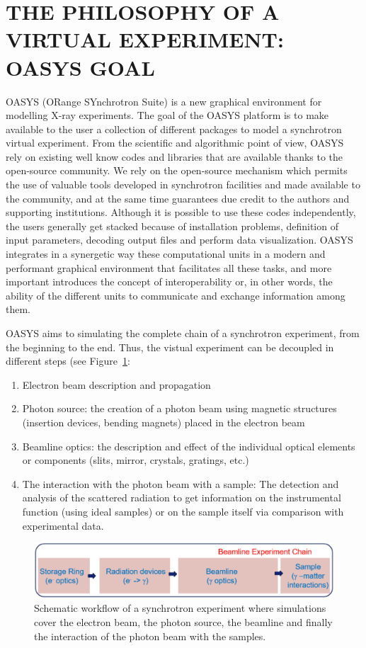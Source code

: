 \documentclass{aip-cp}
\begin{document}
\section{THE PHILOSOPHY OF A VIRTUAL EXPERIMENT: OASYS GOAL}

OASYS (ORange SYnchrotron Suite) is a new graphical environment for modelling X-ray experiments. The goal of the OASYS platform is to make available to the user a collection of different packages to model a synchrotron virtual experiment. From the scientific and algorithmic point of view, OASYS rely on existing well know codes and libraries that are available  thanks to the open-source community. We rely on the open-source mechanism which permits the use of valuable tools developed in synchrotron facilities and made available to the community, and at the same time guarantees due credit to the authors and supporting institutions. Although it is possible to use these codes independently, the users generally get stacked because of installation problems, definition of input parameters, decoding output files and perform data visualization. OASYS integrates in a synergetic way these computational units in a modern and performant graphical environment that facilitates all these tasks, and more important introduces the concept of interoperability or, in other words, the ability of the different units to communicate and exchange information among them. 

OASYS aims to simulating the complete chain of a synchrotron experiment, from the beginning to the end. Thus, the vistual experiment can be decoupled in different steps (see Figure~\ref{figChain0}: 
\begin{enumerate}
 \item Electron beam description and propagation
 \item Photon source: the creation of a photon beam using magnetic structures (insertion devices, bending magnets) placed in the electron beam 
 \item Beamline optics: the description and effect of the individual optical elements or components (slits, mirror, crystals, gratings, etc.)
 \item The interaction with the photon beam with a sample: The detection and analysis of the scattered radiation to get information on the instrumental function (using ideal samples) or on the sample itself via comparison with experimental data. 
\end{enumerate}


\begin{figure}[h]
\includegraphics[width=14cm]{FIGURES/chain0.png}
\caption{Schematic workflow of a synchrotron experiment where simulations cover the electron beam, the photon source, the beamline and finally the interaction of the photon beam with the samples.}
\label{figChain0}
\end{figure}
\end{document}
